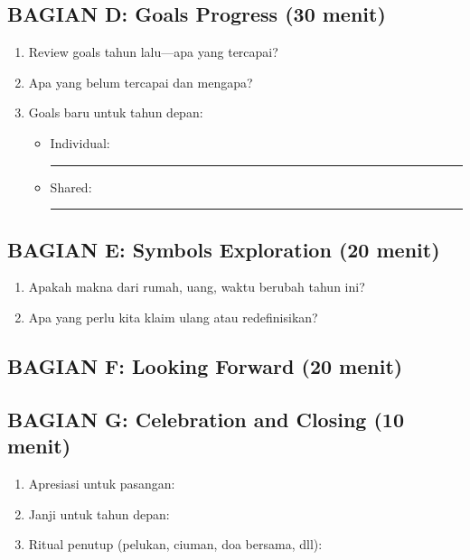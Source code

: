\begin{exercisebox}
\subsection*{BAGIAN D: Goals Progress (30 menit)}
\begin{enumerate}
    \item Review goals tahun lalu---apa yang tercapai?
    \item Apa yang belum tercapai dan mengapa?
    \item Goals baru untuk tahun depan:
    \begin{itemize}
        \item Individual: \rule{8cm}{0.4pt}
        \item Shared: \rule{8cm}{0.4pt}
    \end{itemize}
\end{enumerate}

\subsection*{BAGIAN E: Symbols Exploration (20 menit)}
\begin{enumerate}
    \item Apakah makna dari rumah, uang, waktu berubah tahun ini?
    \item Apa yang perlu kita klaim ulang atau redefinisikan?
\end{enumerate}

\subsection*{BAGIAN F: Looking Forward (20 menit)}

\subsection*{BAGIAN G: Celebration and Closing (10 menit)}
\begin{enumerate}
    \item Apresiasi untuk pasangan:
    \item Janji untuk tahun depan:
    \item Ritual penutup (pelukan, ciuman, doa bersama, dll):
\end{enumerate}


\end{exercisebox}
